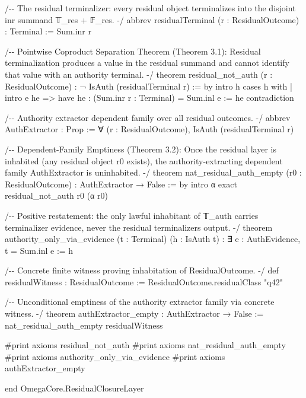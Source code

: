 \documentclass[
  10pt,
]{article}
\newenvironment{Shaded}{}{}
\newcommand{\NormalTok}[1]{#1}
\begin{document}
\begin{Shaded}
\begin{Highlighting}[]
\NormalTok{/{-}{-} The residual terminalizer: every residual object terminalizes into the}
\NormalTok{    disjoint \textasciigrave{}inr\textasciigrave{} summand \textasciigrave{}𝕋\_res + 𝔽\_res\textasciigrave{}. {-}/}
\NormalTok{abbrev residualTerminal (r : ResidualOutcome) : Terminal := Sum.inr r}

\NormalTok{/{-}{-} Pointwise Coproduct Separation Theorem (Theorem 3.1):}
\NormalTok{    Residual terminalization produces a value in the residual summand and}
\NormalTok{    cannot identify that value with an authority terminal. {-}/}
\NormalTok{theorem residual\_not\_auth (r : ResidualOutcome) : ¬ IsAuth (residualTerminal r) := by}
\NormalTok{  intro h}
\NormalTok{  cases h with}
\NormalTok{  | intro e he =\textgreater{}}
\NormalTok{    have he\textquotesingle{} : (Sum.inr r : Terminal) = Sum.inl e := he}
\NormalTok{    contradiction}

\NormalTok{/{-}{-} Authority extractor dependent family over all residual outcomes. {-}/}
\NormalTok{abbrev AuthExtractor : Prop := ∀ (r : ResidualOutcome), IsAuth (residualTerminal r)}

\NormalTok{/{-}{-} Dependent{-}Family Emptiness (Theorem 3.2):}
\NormalTok{    Once the residual layer is inhabited (any residual object \textasciigrave{}r0\textasciigrave{} exists),}
\NormalTok{    the authority{-}extracting dependent family \textasciigrave{}AuthExtractor\textasciigrave{} is uninhabited. {-}/}
\NormalTok{theorem nat\_residual\_auth\_empty (r0 : ResidualOutcome) : AuthExtractor → False := by}
\NormalTok{  intro α}
\NormalTok{  exact residual\_not\_auth r0 (α r0)}

\NormalTok{/{-}{-} Positive restatement: the only lawful inhabitant of \textasciigrave{}𝕋\_auth\textasciigrave{} carries}
\NormalTok{    terminalizer evidence, never the residual terminalizer\textquotesingle{}s output. {-}/}
\NormalTok{theorem authority\_only\_via\_evidence (t : Terminal) (h : IsAuth t) :}
\NormalTok{    ∃ e : AuthEvidence, t = Sum.inl e := h}

\NormalTok{/{-}{-} Concrete finite witness proving inhabitation of \textasciigrave{}ResidualOutcome\textasciigrave{}. {-}/}
\NormalTok{def residualWitness : ResidualOutcome :=}
\NormalTok{  ResidualOutcome.residualClass "q42"}

\NormalTok{/{-}{-} Unconditional emptiness of the authority extractor family via concrete witness. {-}/}
\NormalTok{theorem authExtractor\_empty : AuthExtractor → False :=}
\NormalTok{  nat\_residual\_auth\_empty residualWitness}

\NormalTok{\#print axioms residual\_not\_auth}
\NormalTok{\#print axioms nat\_residual\_auth\_empty}
\NormalTok{\#print axioms authority\_only\_via\_evidence}
\NormalTok{\#print axioms authExtractor\_empty}

\NormalTok{end OmegaCore.ResidualClosureLayer}
\end{Highlighting}
\end{Shaded}
\end{document}
